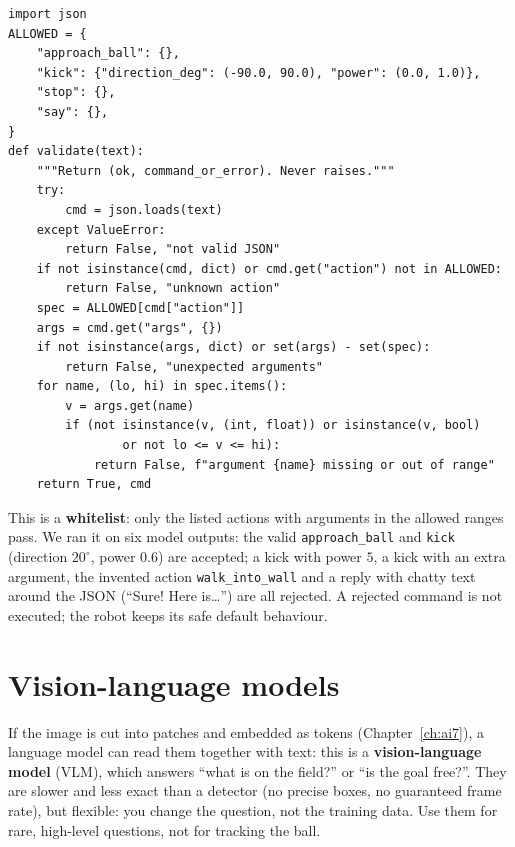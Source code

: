 \begin{verbatim}
import json
ALLOWED = {
    "approach_ball": {},
    "kick": {"direction_deg": (-90.0, 90.0), "power": (0.0, 1.0)},
    "stop": {},
    "say": {},
}
def validate(text):
    """Return (ok, command_or_error). Never raises."""
    try:
        cmd = json.loads(text)
    except ValueError:
        return False, "not valid JSON"
    if not isinstance(cmd, dict) or cmd.get("action") not in ALLOWED:
        return False, "unknown action"
    spec = ALLOWED[cmd["action"]]
    args = cmd.get("args", {})
    if not isinstance(args, dict) or set(args) - set(spec):
        return False, "unexpected arguments"
    for name, (lo, hi) in spec.items():
        v = args.get(name)
        if (not isinstance(v, (int, float)) or isinstance(v, bool)
                or not lo <= v <= hi):
            return False, f"argument {name} missing or out of range"
    return True, cmd
\end{verbatim}
This is a \textbf{whitelist}: only the listed actions with arguments in the allowed ranges pass. We ran it on six model outputs: the valid \texttt{approach\_ball} and \texttt{kick} (direction $20^\circ$, power $0.6$) are accepted; a kick with power $5$, a kick with an extra argument, the invented action \texttt{walk\_into\_wall} and a reply with chatty text around the JSON (``Sure! Here is\dots'') are all rejected. A rejected command is not executed; the robot keeps its safe default behaviour.

\section*{Vision-language models}
If the image is cut into patches and embedded as tokens (Chapter~\ref{ch:ai7}), a language model can read them together with text: this is a \textbf{vision-language model} (VLM), which answers ``what is on the field?'' or ``is the goal free?''. They are slower and less exact than a detector (no precise boxes, no guaranteed frame rate), but flexible: you change the question, not the training data. Use them for rare, high-level questions, not for tracking the ball.

